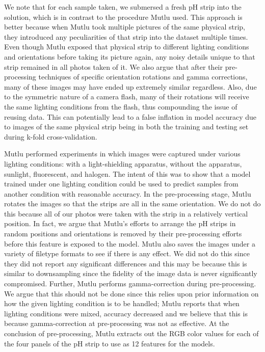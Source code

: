 \documentclass[journal]{IEEEtran}
\begin{document}
We note that for each sample taken, we submersed a fresh pH strip into the solution, which is in contrast to the procedure Mutlu used. This approach is better because when Mutlu took multiple pictures of the same physical strip, they introduced any peculiarities of that strip into the dataset multiple times. Even though Mutlu exposed that physical strip to different lighting conditions and orientations before taking its picture again, any noisy details unique to that strip remained in all photos taken of it. We also argue that after their pre-processing techniques of specific orientation rotations and gamma corrections, many of these images may have ended up extremely similar regardless. Also, due to the symmetric nature of a camera flash, many of their rotations will receive the same lighting conditions from the flash, thus compounding the issue of reusing data. This can potentially lead to a false inflation in model accuracy due to images of the same physical strip being in both the training and testing set during k-fold cross-validation.

Mutlu performed experiments in which images were captured under various lighting conditions: with a light-shielding apparatus, without the apparatus, sunlight, fluorescent, and halogen. The intent of this was to show that a model trained under one lighting condition could be used to predict samples from another condition with reasonable accuracy. In the pre-processing stage, Mutlu rotates the images so that the strips are all in the same orientation. We do not do this because all of our photos were taken with the strip in a relatively vertical position. In fact, we argue that Mutlu’s efforts to arrange the pH strips in random positions and orientations is removed by their pre-processing efforts before this feature is exposed to the model. Mutlu also saves the images under a variety of filetype formats to see if there is any effect. We did not do this since they did not report any significant differences and this may be because this is similar to downsampling since the fidelity of the image data is never significantly compromised. Further, Mutlu performs gamma-correction during pre-processing. We argue that this should not be done since this relies upon prior information on how the given lighting condition is to be handled; Mutlu reports that when lighting conditions were mixed, accuracy decreased and we believe that this is because gamma-correction at pre-processing was not as effective. At the conclusion of pre-processing, Mutlu extracts out the RGB color values for each of the four panels of the pH strip to use as 12 features for the models.
\end{document}
